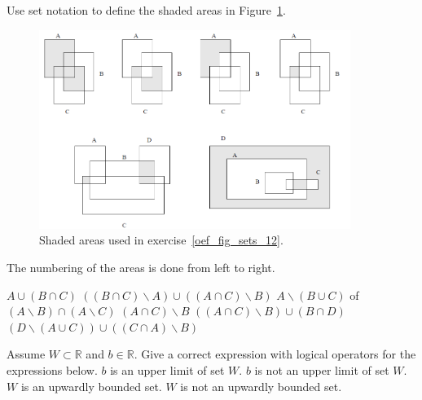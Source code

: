 \begin{Exercise} [difficulty = 2, label=oef_fig_sets_12] Use set notation to define the shaded areas in Figure~\ref{fig_sets_12}. \label{oef_verz} 
	\begin{figure}[H]
		\begin{center}
			\includegraphics[width=0.9\textwidth]{fig_sets_12}
			\caption{Shaded areas used in exercise~\ref{oef_fig_sets_12}.}
			\label{fig_sets_12}
		\end{center}
	\end{figure}
\end{Exercise}

\begin{Answer}\phantom{}
    The numbering of the areas is done from left to right.
    	\begin{multicols}{2}
    
        	\Question $A \cup (B \cap C) $
        	\Question $((B \cap C) \backslash A) \cup  ((A \cap C) \backslash B) $
        	\Question $ A \backslash (B \cup C)$ of $ (A \backslash B) \cap (A \backslash C)$
        	\Question $(A \cap C) \backslash B$
        	\Question $((A \cap C) \backslash B) \cup (B \cap D) $
        	\Question $(D \backslash (A \cup C)) \cup ((C \cap A) \backslash B) $
        	\EndCurrentQuestion
    	\end{multicols}
\end{Answer}

\ifanalysis

\begin{Exercise} Assume $W \subset \mathbb{R}$ and $b \in \mathbb{R}$. Give a correct expression with logical operators for the expressions below. 
		\Question[difficulty = 1] $b$ is an upper limit of set $W$.
		\Question[difficulty = 1] $b$ is not an upper limit of set $W$.
		\Question[difficulty = 2] $W$ is an upwardly bounded set.
		\Question[difficulty = 2] $W$ is not an upwardly bounded set.
\end{Exercise}

